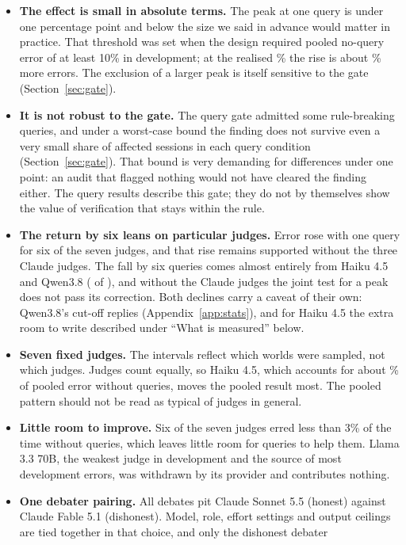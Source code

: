 \begin{itemize}[leftmargin=1.4em,itemsep=2pt,topsep=2pt]
\item \textbf{The effect is small in absolute terms.} The peak at one query is under one percentage point and below
the size we said in advance would matter in practice. That threshold was set when the design required pooled
no-query error of at least 10\% in development; at the realised \errKzero\% the rise is about \relRise\% more errors.
The exclusion of a larger peak is itself sensitive to the gate (Section~\ref{sec:gate}).
\item \textbf{It is not robust to the gate.} The query gate admitted some rule-breaking queries, and under a
worst-case bound the finding does not survive even a very small share of affected sessions in each query condition
(Section~\ref{sec:gate}). That bound is very demanding for differences under one point: an audit that flagged
nothing would not have cleared the finding either. The query results describe this gate; they do not by themselves
show the value of verification that stays within the rule.
\item \textbf{The return by six leans on particular judges.} Error rose with one query for six of the seven judges,
and that rise remains supported without the three Claude judges. The fall by six queries comes almost entirely from
Haiku 4.5 and Qwen3.8 (\haikuQwenFall{} of \dOneSix{} \pp), and without the Claude judges the joint test for a peak
does not pass its correction. Both declines carry a caveat of their own: Qwen3.8's cut-off replies
(Appendix~\ref{app:stats}), and for Haiku 4.5 the extra room to write described under ``What is measured'' below.
\item \textbf{Seven fixed judges.} The intervals reflect which worlds were sampled, not which judges. Judges count
equally, so Haiku 4.5, which accounts for about \haikuErrShare\% of pooled error without queries, moves the pooled
result most. The pooled pattern should not be read as typical of judges in general.
\item \textbf{Little room to improve.} Six of the seven judges erred less than 3\% of the time without queries, which
leaves little room for queries to help them. Llama 3.3 70B, the weakest judge in development and the source of most
development errors, was withdrawn by its provider and contributes nothing.
\item \textbf{One debater pairing.} All debates pit Claude Sonnet 5.5 (honest) against Claude Fable 5.1 (dishonest).
Model, role, effort settings and output ceilings are tied together in that choice, and only the dishonest debater

\end{itemize}
